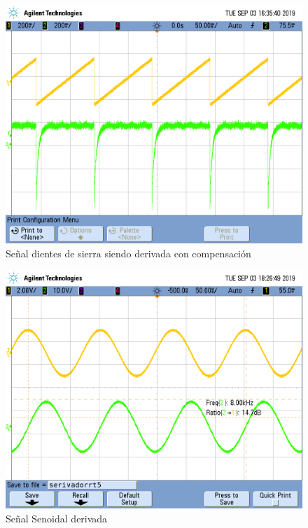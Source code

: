 \documentclass[a4paper]{article}
\begin{document}
\begin{figure}[H]
	\centering
	\includegraphics[width=\textwidth]{Ejercicio4/FOTOS-TP2-TC-EJ4/derivador1}
	\caption{Señal dientes de sierra siendo derivada con compensación}
\end{figure}

\begin{figure}[H]
	\centering
	\includegraphics[width=\textwidth]{Ejercicio4/FOTOS-TP2-TC-EJ4/serivadorrt5}
	\caption{Señal Senoidal derivada}
\end{figure}
\end{document}
